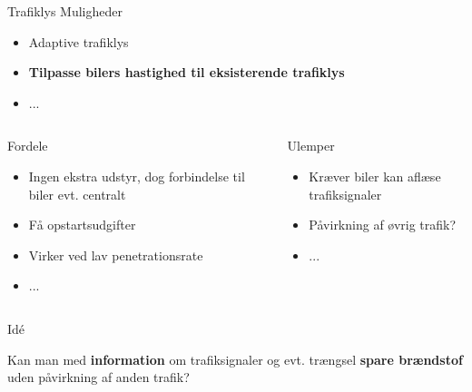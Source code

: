 \begin{frame}{Trafiklys}
Muligheder
\begin{itemize}
\item Adaptive trafiklys
\item \textbf{Tilpasse bilers hastighed til eksisterende trafiklys}
\item ...
\end{itemize}


\begin{center}
\begin{columns}
\begin{column}{0.5\textwidth}
Fordele
\begin{itemize}
\item Ingen ekstra udstyr, dog forbindelse til biler evt. centralt
\item Få opstartsudgifter 
\item Virker ved lav penetrationsrate
\item ...
\end{itemize}
\end{column}

\begin{column}{0.5\textwidth}
Ulemper
\begin{itemize}
\item Kræver biler kan aflæse trafiksignaler
\item Påvirkning af øvrig trafik?
\item ...
\end{itemize}
\end{column}
\end{columns}
\end{center}
\end{frame}

\begin{frame}{Idé}
\begin{center}
Kan man med \textbf{information} om trafiksignaler og evt. trængsel \textbf{spare brændstof} uden påvirkning af anden trafik?
\end{center}
\end{frame}



